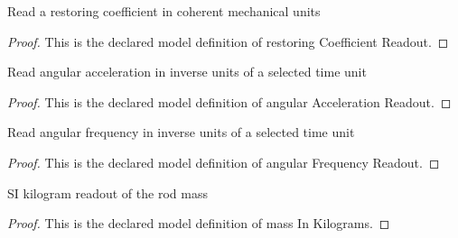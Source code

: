 \begin{definition}
  \label{def:physics:phyx-mini-0268:phyxminiproblems-problemphyxmini0268-restoringcoefficientreadout}
  Read a restoring coefficient in coherent mechanical units
\end{definition}
\begin{proof}
  This is the declared model definition of restoring Coefficient Readout.
\end{proof}
\begin{definition}
  \label{def:physics:phyx-mini-0268:phyxminiproblems-problemphyxmini0268-angularaccelerationreadout}
  Read angular acceleration in inverse units of a selected time unit
\end{definition}
\begin{proof}
  This is the declared model definition of angular Acceleration Readout.
\end{proof}
\begin{definition}
  \label{def:physics:phyx-mini-0268:phyxminiproblems-problemphyxmini0268-angularfrequencyreadout}
  Read angular frequency in inverse units of a selected time unit
\end{definition}
\begin{proof}
  This is the declared model definition of angular Frequency Readout.
\end{proof}
\begin{definition}
  \label{def:physics:phyx-mini-0268:phyxminiproblems-problemphyxmini0268-massinkilograms}
  SI kilogram readout of the rod mass
\end{definition}
\begin{proof}
  This is the declared model definition of mass In Kilograms.
\end{proof}
